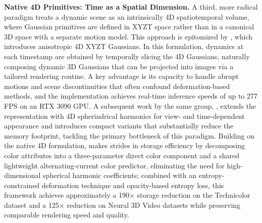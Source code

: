 \documentclass[11pt]{article}
\begin{document}
\textbf{Native 4D Primitives: Time as a Spatial Dimension.} A third, more radical paradigm treats a dynamic scene as an intrinsically 4D spatiotemporal volume, where Gaussian primitives are defined in XYZT space rather than in a canonical 3D space with a separate motion model. This approach is epitomized by \cite{ref338}, which introduces anisotropic 4D XYZT Gaussians. In this formulation, dynamics at each timestamp are obtained by temporally slicing the 4D Gaussians, naturally composing dynamic 3D Gaussians that can be projected into images via a tailored rendering routine. A key advantage is its capacity to handle abrupt motions and scene discontinuities that often confound deformation-based methods, and the implementation achieves real-time inference speeds of up to 277 FPS on an RTX 3090 GPU. A subsequent work by the same group, \cite{ref339}, extends the representation with 4D spherindrical harmonics for view- and time-dependent appearance and introduces compact variants that substantially reduce the memory footprint, tackling the primary bottleneck of this paradigm. Building on the native 4D formulation, \cite{ref340} makes strides in storage efficiency by decomposing color attributes into a three-parameter direct color component and a shared lightweight alternating-current color predictor, eliminating the need for high-dimensional spherical harmonic coefficients; combined with an entropy-constrained deformation technique and opacity-based entropy loss, this framework achieves approximately a 190× storage reduction on the Technicolor dataset and a 125× reduction on Neural 3D Video datasets while preserving comparable rendering speed and quality.
\end{document}
